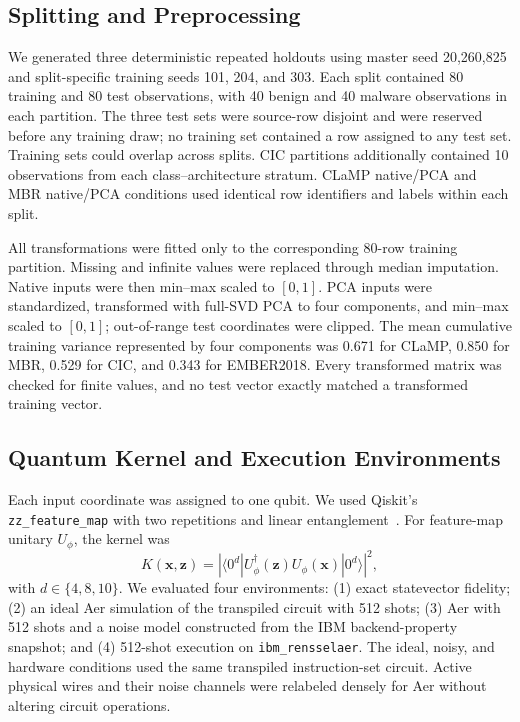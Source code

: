 \subsection{Splitting and Preprocessing}

We generated three deterministic repeated holdouts using master seed 20,260,825 and split-specific training seeds 101, 204, and 303. Each split contained 80 training and 80 test observations, with 40 benign and 40 malware observations in each partition. The three test sets were source-row disjoint and were reserved before any training draw; no training set contained a row assigned to any test set. Training sets could overlap across splits. CIC partitions additionally contained 10 observations from each class--architecture stratum. CLaMP native/PCA and MBR native/PCA conditions used identical row identifiers and labels within each split.

All transformations were fitted only to the corresponding 80-row training partition. Missing and infinite values were replaced through median imputation. Native inputs were then min--max scaled to $[0,1]$. PCA inputs were standardized, transformed with full-SVD PCA to four components, and min--max scaled to $[0,1]$; out-of-range test coordinates were clipped. The mean cumulative training variance represented by four components was 0.671 for CLaMP, 0.850 for MBR, 0.529 for CIC, and 0.343 for EMBER2018. Every transformed matrix was checked for finite values, and no test vector exactly matched a transformed training vector.

\subsection{Quantum Kernel and Execution Environments}

Each input coordinate was assigned to one qubit. We used Qiskit's \texttt{zz\_feature\_map} with two repetitions and linear entanglement~\cite{qiskit2024}. For feature-map unitary $U_{\phi}$, the kernel was
\begin{equation}
K(\mathbf{x},\mathbf{z})=
\left|\langle 0^{d}|U_{\phi}^{\dagger}(\mathbf{z})
U_{\phi}(\mathbf{x})|0^{d}\rangle\right|^{2},
\label{eq:fidelity-kernel}
\end{equation}
with $d\in\{4,8,10\}$. We evaluated four environments: (1) exact statevector fidelity; (2) an ideal Aer simulation of the transpiled circuit with 512 shots; (3) Aer with 512 shots and a noise model constructed from the IBM backend-property snapshot; and (4) 512-shot execution on \texttt{ibm\_rensselaer}. The ideal, noisy, and hardware conditions used the same transpiled instruction-set circuit. Active physical wires and their noise channels were relabeled densely for Aer without altering circuit operations.

